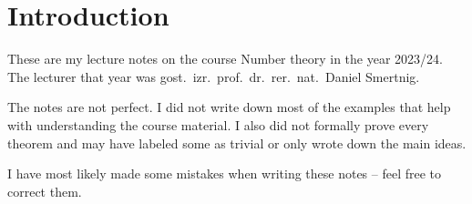 \section*{Introduction}

These are my lecture notes on the course Number theory in the year
2023/24. The lecturer that year was
gost.~izr.~prof.~dr.~rer.~nat.~Daniel Smertnig.

The notes are not perfect. I did not write down most of the examples
that help with understanding the course material. I also did not
formally prove every theorem and may have labeled some as trivial or
only wrote down the main ideas.

I have most likely made some mistakes when writing these notes --
feel free to correct them.
